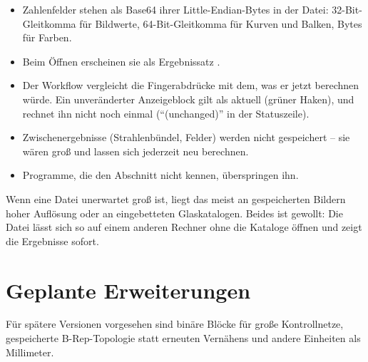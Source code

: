 \begin{itemize}
  \item Zahlenfelder stehen als Base64 ihrer Little-Endian-Bytes in der Datei: 32-Bit-Gleitkomma
    für Bildwerte, 64-Bit-Gleitkomma für Kurven und Balken, Bytes für Farben.
  \item Beim Öffnen erscheinen sie als Ergebnissatz .
  \item Der Workflow vergleicht die Fingerabdrücke mit dem, was er jetzt berechnen würde. Ein
    unveränderter Anzeigeblock gilt als aktuell (grüner Haken), und  rechnet
    ihn nicht noch einmal (\enquote{(unchanged)} in der Statuszeile).
  \item Zwischenergebnisse (Strahlenbündel, Felder) werden nicht gespeichert -- sie wären
    groß und lassen sich jederzeit neu berechnen.
  \item Programme, die den Abschnitt nicht kennen, überspringen ihn.
\end{itemize}

\begin{tipp}
Wenn eine Datei unerwartet groß ist, liegt das meist an gespeicherten Bildern hoher Auflösung
oder an eingebetteten Glaskatalogen. Beides ist gewollt: Die Datei lässt sich so auf einem
anderen Rechner ohne die Kataloge öffnen und zeigt die Ergebnisse sofort.
\end{tipp}

\section{Geplante Erweiterungen}

Für spätere Versionen vorgesehen sind binäre Blöcke für große Kontrollnetze, gespeicherte
B-Rep-Topologie statt erneuten Vernähens und andere Einheiten als Millimeter.
